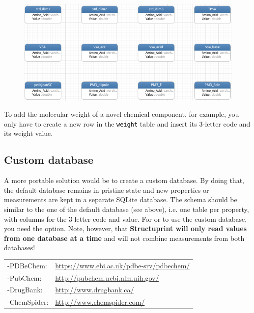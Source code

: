 \documentclass[12pt,a4paper]{article}
\begin{document}
\begin{figure}[!htbp]
    \centering
	\includegraphics[width=\textwidth]{figures/schema.png}
\end{figure}

To add the molecular weight of a novel chemical component, 
for example, you only have to create a new row in 
the \texttt{weight} table and insert its 3-letter code and its weight 
value.

\subsection{Custom database}\label{sec:custom_db}
A more portable solution would be to create a custom database. 
By doing that, the default database remains in pristine state and new 
properties or measurements are kept in a separate SQLite database. The 
schema should be similar to the one of the default database (see above), i.e. one 
table per property, with columns for the 3-letter code and value. For 
 or  to use the custom 
database, you need the  option. Note, however, that 
\textbf{Structuprint will only read values from one database at a time} and will 
not combine measurements from both databases!\\

\begin{myboxii}
\begin{tabular}{ll}
-PDBeChem: & \url{https://www.ebi.ac.uk/pdbe-srv/pdbechem/}\\
-PubChem: & \url{http://pubchem.ncbi.nlm.nih.gov/}\\
-DrugBank: & \url{http://www.drugbank.ca/}\\
-ChemSpider: & \url{http://www.chemspider.com/}\\
\end{tabular}
\end{myboxii}
\end{document}
